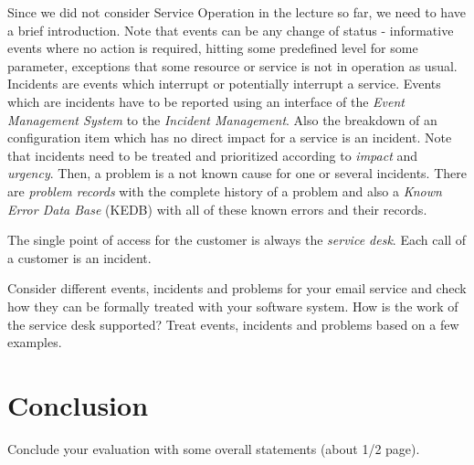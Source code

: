 Since we did not consider Service Operation in the lecture so far, we need to have a brief introduction. Note that events can be any change of status - informative events where no action is required, hitting some predefined level for some parameter, exceptions that some resource or service is not in operation as usual. Incidents are events which interrupt or potentially interrupt a service. Events which are incidents have to be reported using an interface of the \emph{Event Management System} to the \emph{Incident Management}. Also the breakdown of an configuration item which has no direct impact for a service is an incident. Note that incidents need to be treated and prioritized according to \emph{impact} and \emph{urgency}. Then, a problem is a not known cause for one or several incidents. There are \emph{problem records} with the complete history of a problem and also a \emph{Known Error Data Base} (KEDB) with all of these known errors and their records.

The single point of access for the customer is always the \emph{service desk}. Each call of a customer is an incident.

Consider different events, incidents and problems for your email service and check how they can be formally treated with your software system. How is the work of the service desk supported? Treat events, incidents and problems based on a few examples. 

\chapter{Conclusion}

Conclude your evaluation with some overall statements (about 1/2 page).